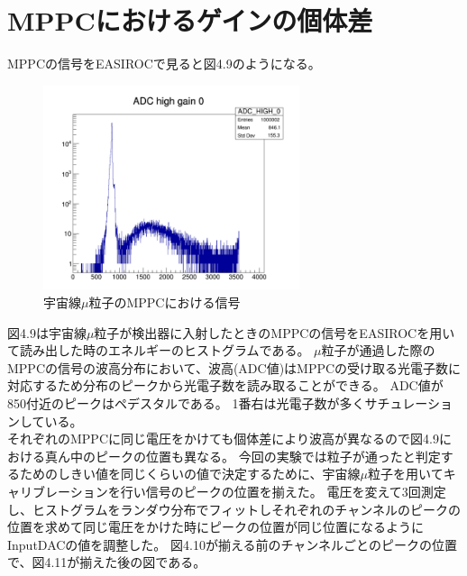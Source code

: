\section{MPPCにおけるゲインの個体差}
MPPCの信号をEASIROCで見ると図4.9のようになる。
\begin{figure}[H]
    \centering
    \includegraphics[height=6cm]{img/mppc_gain.jpg}
    \caption{宇宙線$\mu$粒子のMPPCにおける信号}
\end{figure}
図4.9は宇宙線$\mu$粒子が検出器に入射したときのMPPCの信号をEASIROCを用いて読み出した時のエネルギーのヒストグラムである。
$\mu$粒子が通過した際のMPPCの信号の波高分布において、波高(ADC値)はMPPCの受け取る光電子数に対応するため分布のピークから光電子数を読み取ることができる。
ADC値が850付近のピークはペデスタルである。
1番右は光電子数が多くサチュレーションしている。\\
それぞれのMPPCに同じ電圧をかけても個体差により波高が異なるので図4.9における真ん中のピークの位置も異なる。
今回の実験では粒子が通ったと判定するためのしきい値を同じくらいの値で決定するために、宇宙線$\mu$粒子を用いてキャリブレーションを行い信号のピークの位置を揃えた。
電圧を変えて3回測定し、ヒストグラムをランダウ分布でフィットしそれぞれのチャンネルのピークの位置を求めて同じ電圧をかけた時にピークの位置が同じ位置になるようにInputDACの値を調整した。
図4.10が揃える前のチャンネルごとのピークの位置で、図4.11が揃えた後の図である。

